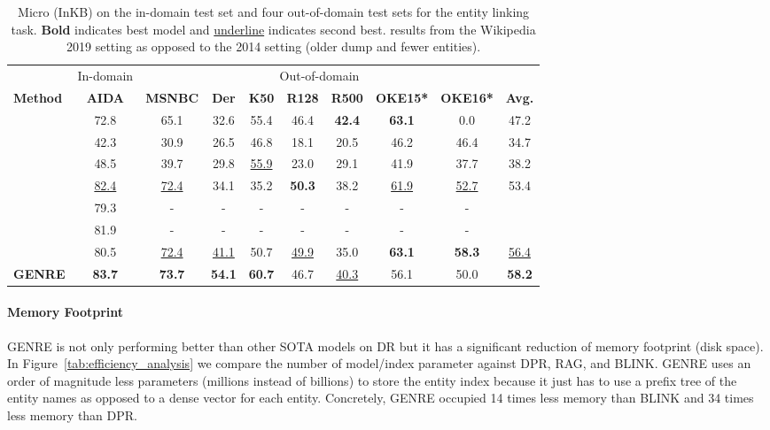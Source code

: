 \documentclass{article} \usepackage{main,times}
\makeatletter
\def\genre{\textsc{GENRE}\@\xspace}
\makeatother
\begin{document}
\begin{table}[t]
{\fontsize{8.4}{10.1}\selectfont \setlength{\tabcolsep}{0.5em}
\begin{tabular}{lcccccccc|c}
\toprule
& In-domain  & \multicolumn{7}{c}{Out-of-domain}  \\
\textbf{Method} & \textbf{AIDA} & \textbf{MSNBC} &  \textbf{Der} &  \textbf{K50} & \textbf{R128} & \textbf{R500} & \textbf{OKE15*} & \textbf{OKE16*} & \textbf{Avg.}\\
\midrule
\citet{hoffart-etal-2011-robust}     &   72.8 &   65.1 &       32.6 &   55.4 &          46.4 &       \textbf{42.4} &     \textbf{63.1} &      0.0 & 47.2 \\
\citet{10.1007/978-3-642-38288-8_26} &   42.3 &   30.9 &       26.5 &  46.8  &   18.1 &       20.5 &     46.2 &     46.4 & 34.7 \\
\citet{moro-etal-2014-entity}        &   48.5 &   39.7 &       29.8 &   \underline{55.9} &  23.0 &       29.1 &  41.9 &     37.7 & 38.2 \\
\citet{kolitsas-etal-2018-end}       &   \underline{82.4} &   \underline{72.4} &       34.1 &   35.2&  \textbf{50.3} &       38.2 &     \underline{61.9} &     \underline{52.7} & 53.4\\
\citet{broscheit-2019-investigating} &   79.3 &    - &        - &    - & - &    - &  - &    -  \\
\citet{martins-etal-2019-joint}      &   81.9 &    - &        - & - &    -&    - &    - &  - \\
\citet{10.1145/3397271.3401416}      &   80.5 &   \underline{72.4} &       \underline{41.1} &   50.7 & \underline{49.9} & 35.0  & \textbf{63.1} & \textbf{58.3} & \underline{56.4} \\
\midrule
\textbf{\genre} &   \textbf{83.7} &   \textbf{73.7} & \textbf{54.1} &   \textbf{60.7} & 46.7 & \underline{40.3} & 56.1 & 50.0 & \textbf{58.2} \\ 

\bottomrule

\end{tabular}
}
\caption{Micro  (InKB) on the in-domain test set and four out-of-domain test sets for the entity linking task. \textbf{Bold} indicates best model and \underline{underline} indicates second best. 
results from the Wikipedia 2019 setting as opposed to the 2014 setting (older dump and fewer entities).}
\label{tab:el-results}
\end{table}
 
\paragraph{Memory Footprint} 
\genre is not only performing better than other SOTA models on DR but it has a significant reduction of memory footprint (disk space). In Figure~\ref{tab:efficiency_analysis} we compare the number of model/index parameter against DPR, RAG, and BLINK. \genre uses an order of magnitude less parameters (millions instead of billions) to store the entity index because it just has to use a prefix tree of the entity names as opposed to a dense vector for each entity. Concretely, \genre occupied 14 times less memory than BLINK and 34 times less memory than DPR.
\end{document}
